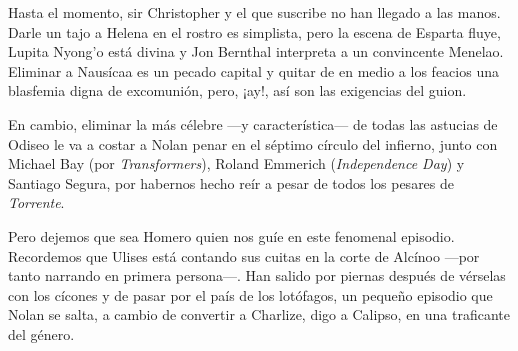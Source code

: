 \label{cap:ciclope}

Hasta el momento, sir Christopher y el que suscribe no han llegado a las manos. Darle un tajo a Helena en el rostro es simplista, pero la escena de Esparta fluye, Lupita Nyong'o está divina y Jon Bernthal interpreta a un convincente Menelao. Eliminar a Nausícaa es un pecado capital y quitar de en medio a los feacios una blasfemia digna de excomunión, pero, ¡ay!, así son las exigencias del guion.

En cambio, eliminar la más célebre ---y característica--- de todas las astucias de Odiseo le va a costar a Nolan penar en el séptimo círculo del infierno, junto con Michael Bay (por \emph{Transformers}), Roland Emmerich (\emph{Independence Day}) y Santiago Segura, por habernos hecho reír a pesar de todos los pesares de \emph{Torrente}.

Pero dejemos que sea Homero quien nos guíe en este fenomenal episodio. Recordemos que Ulises está contando sus cuitas en la corte de Alcínoo ---por tanto narrando en primera persona---. Han salido por piernas después de vérselas con los cícones y de pasar por el país de los lotófagos, un pequeño episodio que Nolan se salta, a cambio de convertir a Charlize, digo a Calipso, en una traficante del género.

